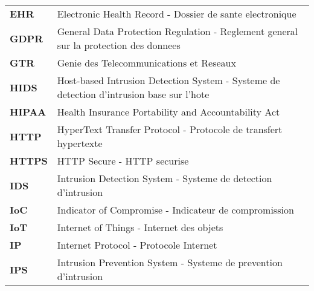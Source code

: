 \begin{longtable}{p{3cm} p{12cm}}
    \textbf{EHR}     & Electronic Health Record - Dossier de sante electronique                                               \\[0.3cm]

    \textbf{GDPR}    & General Data Protection Regulation - Reglement general sur la protection des donnees                   \\[0.3cm]

    \textbf{GTR}     & Genie des Telecommunications et Reseaux                                                                \\[0.3cm]

    \textbf{HIDS}    & Host-based Intrusion Detection System - Systeme de detection d'intrusion base sur l'hote               \\[0.3cm]

    \textbf{HIPAA}   & Health Insurance Portability and Accountability Act                                                    \\[0.3cm]

    \textbf{HTTP}    & HyperText Transfer Protocol - Protocole de transfert hypertexte                                        \\[0.3cm]

    \textbf{HTTPS}   & HTTP Secure - HTTP securise                                                                            \\[0.3cm]

    \textbf{IDS}     & Intrusion Detection System - Systeme de detection d'intrusion                                          \\[0.3cm]

    \textbf{IoC}     & Indicator of Compromise - Indicateur de compromission                                                  \\[0.3cm]

    \textbf{IoT}     & Internet of Things - Internet des objets                                                               \\[0.3cm]

    \textbf{IP}      & Internet Protocol - Protocole Internet                                                                 \\[0.3cm]

    \textbf{IPS}     & Intrusion Prevention System - Systeme de prevention d'intrusion                                        \\[0.3cm]


\end{longtable}
